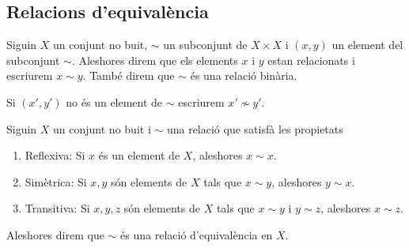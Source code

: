 \documentclass[../Apunts.tex]{subfiles}
\begin{document}
	\subsection{Relacions d'equivalència}
	\begin{definition}
		\label{def:relació binària}
		Siguin \(X\) un conjunt no buit, \(\sim\) un subconjunt de \(X\times X\) i \((x,y)\) un element del subconjunt \(\sim\). Aleshores direm que els elements \(x\) i \(y\) estan relacionats i escriurem \(x\sim y\). També direm que \(\sim\) és una relació binària.
		
		Si \((x',y')\) no és un element de \(\sim\) escriurem \(x'\nsim y'\).
	\end{definition}
	\begin{definition}
		\label{def:relació d'equivalència}
		Siguin \(X\) un conjunt no buit i \(\sim\) una relació que satisfà les propietats
		\begin{enumerate}
			\item Reflexiva: Si \(x\) és un element de \(X\), aleshores \(x\sim x\).
			\item Simètrica: Si \(x,y\) són elements de \(X\) tals que \(x\sim y\), aleshores \(y\sim x\).
			\item Transitiva: Si \(x,y,z\) són elements de \(X\) tals que \(x\sim y\) i \(y\sim z\), aleshores \(x\sim z\).
		\end{enumerate}
		Aleshores direm que \(\sim\) és una relació d'equivalència en \(X\).
	\end{definition}
\end{document}
